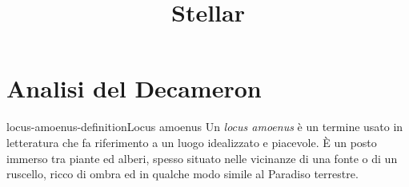 \documentclass[preview]{standalone}
\begin{document}
\title{Stellar}
\genpage

\section{Analisi del Decameron}


\begin{snippetdefinition}{locus-amoenus-definition}{Locus amoenus}
    Un \textit{locus amoenus} è un termine usato in letteratura
    che fa riferimento a un luogo idealizzato e piacevole.
    È un posto immerso tra piante ed alberi,
    spesso situato nelle vicinanze di una fonte o di un ruscello,
    ricco di ombra ed in qualche modo simile al Paradiso terrestre. 
\end{snippetdefinition}
\end{document}
